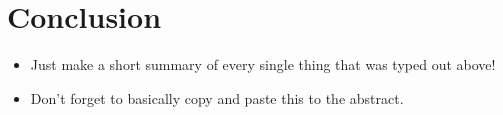\documentclass{article}
\begin{document}
\section{Conclusion}
\begin{itemize}
    \item Just make a short summary of every single thing that was typed out above!
    \item Don't forget to basically copy and paste this to the abstract.
\end{itemize}

\newpage


\end{document}
